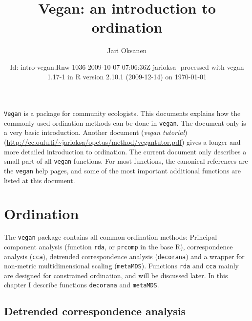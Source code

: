 \documentclass[a4paper,10pt]{amsart}
\title{Vegan: an introduction to ordination}
\author{Jari Oksanen}
\date{$ $Id: intro-vegan.Rnw 1036 2009-10-07 07:06:36Z jarioksa $ $
  processed with vegan
1.17-1
in R version 2.10.1 (2009-12-14) on \today}
\begin{document}


\maketitle

\tableofcontents


\noindent \texttt{Vegan} is a package for community ecologists.  This
documents explains how the commonly used ordination methods can be
done in \texttt{vegan}.  The document only is a very basic
introduction.  Another document (\emph{vegan tutorial})
(\url{http://cc.oulu.fi/~jarioksa/opetus/method/vegantutor.pdf}) gives
a longer and more detailed introduction to ordination.  The
current document only describes a small part of all \texttt{vegan}
functions.  For most functions, the canonical references are the
\texttt{vegan} help pages, and some of the most important additional
functions are listed at this document.

\section{Ordination}

The \texttt{vegan} package contains all common ordination methods:
Principal component analysis (function \texttt{rda}, or
\texttt{prcomp} in the base \textsf{R}), correspondence analysis
(\texttt{cca}), detrended correspondence analysis (\texttt{decorana})
and a wrapper for non-metric multidimensional scaling
(\texttt{metaMDS}).  Functions \texttt{rda} and \texttt{cca} mainly
are designed for constrained ordination, and will be discussed later.
In this chapter I describe functions \texttt{decorana} and
\texttt{metaMDS}.

\subsection{Detrended correspondence analysis}
\end{document}
